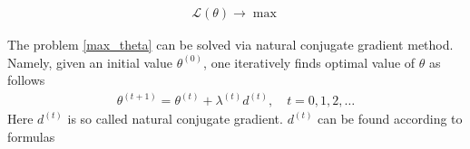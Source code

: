 \begin{equation}
    \begin{aligned}
    \label{max_theta}
    \mathcal L(\theta) \longrightarrow \max
    \end{aligned}
\end{equation}

The problem \ref{max_theta} can be solved via natural conjugate gradient method.
Namely, given an initial value $\theta^{(0)}$, one iteratively finds optimal value of $\theta$ as follows
\begin{equation}
    \begin{aligned}
    \nonumber
    \theta^{(t+1)} = \theta^{(t)} + \lambda^{(t)} d^{(t)}, \quad t = 0, 1, 2, \dots
    \end{aligned}
\end{equation}
Here $d^{(t)}$ is so called natural conjugate gradient.
$d^{(t)}$ can be found according to formulas

